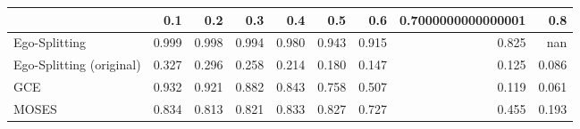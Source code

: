 \begin{tabular}{lrrrrrrrr}
\toprule
{} &   0.1 &   0.2 &   0.3 &   0.4 &   0.5 &   0.6 & 0.7000000000000001 &   0.8 \\
\midrule
Ego-Splitting            & 0.999 & 0.998 & 0.994 & 0.980 & 0.943 & 0.915 &              0.825 &   nan \\
Ego-Splitting (original) & 0.327 & 0.296 & 0.258 & 0.214 & 0.180 & 0.147 &              0.125 & 0.086 \\
GCE                      & 0.932 & 0.921 & 0.882 & 0.843 & 0.758 & 0.507 &              0.119 & 0.061 \\
MOSES                    & 0.834 & 0.813 & 0.821 & 0.833 & 0.827 & 0.727 &              0.455 & 0.193 \\
\bottomrule
\end{tabular}
